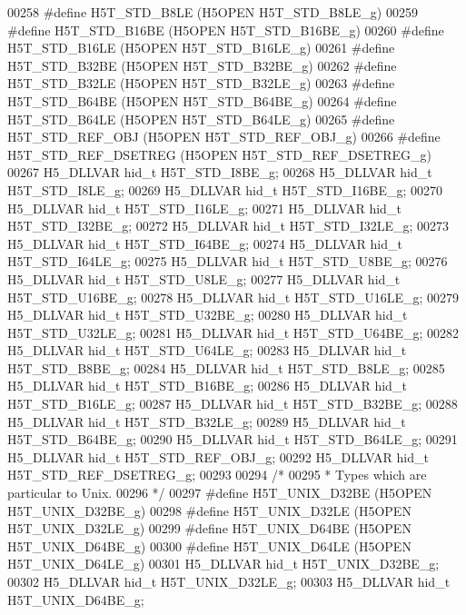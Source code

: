\begin{DoxyCode}
00258 \textcolor{preprocessor}{#define H5T\_STD\_B8LE        (H5OPEN H5T\_STD\_B8LE\_g)}
00259 \textcolor{preprocessor}{#define H5T\_STD\_B16BE       (H5OPEN H5T\_STD\_B16BE\_g)}
00260 \textcolor{preprocessor}{#define H5T\_STD\_B16LE       (H5OPEN H5T\_STD\_B16LE\_g)}
00261 \textcolor{preprocessor}{#define H5T\_STD\_B32BE       (H5OPEN H5T\_STD\_B32BE\_g)}
00262 \textcolor{preprocessor}{#define H5T\_STD\_B32LE       (H5OPEN H5T\_STD\_B32LE\_g)}
00263 \textcolor{preprocessor}{#define H5T\_STD\_B64BE       (H5OPEN H5T\_STD\_B64BE\_g)}
00264 \textcolor{preprocessor}{#define H5T\_STD\_B64LE       (H5OPEN H5T\_STD\_B64LE\_g)}
00265 \textcolor{preprocessor}{#define H5T\_STD\_REF\_OBJ         (H5OPEN H5T\_STD\_REF\_OBJ\_g)}
00266 \textcolor{preprocessor}{#define H5T\_STD\_REF\_DSETREG     (H5OPEN H5T\_STD\_REF\_DSETREG\_g)}
00267 H5\_DLLVAR hid\_t H5T\_STD\_I8BE\_g;
00268 H5\_DLLVAR hid\_t H5T\_STD\_I8LE\_g;
00269 H5\_DLLVAR hid\_t H5T\_STD\_I16BE\_g;
00270 H5\_DLLVAR hid\_t H5T\_STD\_I16LE\_g;
00271 H5\_DLLVAR hid\_t H5T\_STD\_I32BE\_g;
00272 H5\_DLLVAR hid\_t H5T\_STD\_I32LE\_g;
00273 H5\_DLLVAR hid\_t H5T\_STD\_I64BE\_g;
00274 H5\_DLLVAR hid\_t H5T\_STD\_I64LE\_g;
00275 H5\_DLLVAR hid\_t H5T\_STD\_U8BE\_g;
00276 H5\_DLLVAR hid\_t H5T\_STD\_U8LE\_g;
00277 H5\_DLLVAR hid\_t H5T\_STD\_U16BE\_g;
00278 H5\_DLLVAR hid\_t H5T\_STD\_U16LE\_g;
00279 H5\_DLLVAR hid\_t H5T\_STD\_U32BE\_g;
00280 H5\_DLLVAR hid\_t H5T\_STD\_U32LE\_g;
00281 H5\_DLLVAR hid\_t H5T\_STD\_U64BE\_g;
00282 H5\_DLLVAR hid\_t H5T\_STD\_U64LE\_g;
00283 H5\_DLLVAR hid\_t H5T\_STD\_B8BE\_g;
00284 H5\_DLLVAR hid\_t H5T\_STD\_B8LE\_g;
00285 H5\_DLLVAR hid\_t H5T\_STD\_B16BE\_g;
00286 H5\_DLLVAR hid\_t H5T\_STD\_B16LE\_g;
00287 H5\_DLLVAR hid\_t H5T\_STD\_B32BE\_g;
00288 H5\_DLLVAR hid\_t H5T\_STD\_B32LE\_g;
00289 H5\_DLLVAR hid\_t H5T\_STD\_B64BE\_g;
00290 H5\_DLLVAR hid\_t H5T\_STD\_B64LE\_g;
00291 H5\_DLLVAR hid\_t H5T\_STD\_REF\_OBJ\_g;
00292 H5\_DLLVAR hid\_t H5T\_STD\_REF\_DSETREG\_g;
00293 
00294 \textcolor{comment}{/*}
00295 \textcolor{comment}{ * Types which are particular to Unix.}
00296 \textcolor{comment}{ */}
00297 \textcolor{preprocessor}{#define H5T\_UNIX\_D32BE      (H5OPEN H5T\_UNIX\_D32BE\_g)}
00298 \textcolor{preprocessor}{#define H5T\_UNIX\_D32LE      (H5OPEN H5T\_UNIX\_D32LE\_g)}
00299 \textcolor{preprocessor}{#define H5T\_UNIX\_D64BE      (H5OPEN H5T\_UNIX\_D64BE\_g)}
00300 \textcolor{preprocessor}{#define H5T\_UNIX\_D64LE      (H5OPEN H5T\_UNIX\_D64LE\_g)}
00301 H5\_DLLVAR hid\_t H5T\_UNIX\_D32BE\_g;
00302 H5\_DLLVAR hid\_t H5T\_UNIX\_D32LE\_g;
00303 H5\_DLLVAR hid\_t H5T\_UNIX\_D64BE\_g;

\end{DoxyCode}
